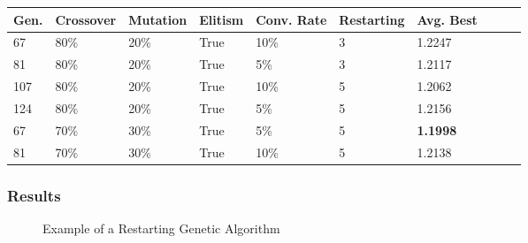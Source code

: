 \documentclass[10pt]{beamer}
\begin{document}
\begin{frame}
	\begin{table}
	  \begin{tabular}{ | l | l | l | l | l | l | l | l | l | l | }
	    \hline
	    Gen. & Crossover & Mutation & Elitism & Conv. Rate & Restarting &  Avg. Best \\ \hline \hline
	    67 & 80\% & 20\% & True & 10\% & 3 & 1.2247 \\ \hline
	    81 & 80\% & 20\% & True & 5\% & 3 & 1.2117 \\ \hline
	    107 & 80\% & 20\% & True & 10\% & 5 & 1.2062 \\ \hline
	    124 & 80\% & 20\% & True & 5\% & 5 & 1.2156 \\ \hline
	    67 & 70\% & 30\% & True & 5\% & 5 & \textbf{1.1998} \\ \hline
	    81 & 70\% & 30\% & True & 10\% & 5 & 1.2138 \\ \hline
	  \end{tabular}
	\end{table}

\end{frame}

\begin{frame}
	\frametitle{Results}

	\begin{figure}
		\caption{Example of a Restarting Genetic Algorithm}
	\end{figure}

\end{frame}
\end{document}
